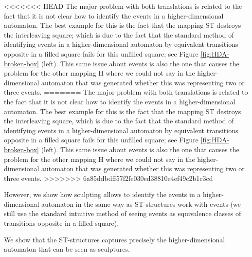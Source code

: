 <<<<<<< HEAD
    The major problem with both translations is related to the fact that it is not clear how to identify the events in a higher-dimensional automaton. The best example for this is the fact that the mapping ST destroys the interleaving square; which is due to the fact that the standard method of identifying events in a higher-dimensional automaton by equivalent transitions opposite in a filled square fails for this unfilled square; see Figure \ref{fig:HDA-broken-box} (left). This same issue about events is also the one that causes the problem for the other mapping H where we could not say in the higher-dimensional automaton that was generated whether this was representing two or three events.
=======
    The major problem with both translations is related to the fact that it is not clear how to identify the events in a higher-dimensional automaton. The best example for this is the fact that the mapping ST destroys the interleaving square, which is due to the fact that the standard method of identifying events in a higher-dimensional automaton by equivalent transitions opposite in a filled square fails for this unfilled square; see Figure \ref{fig:HDA-broken-box} (left). This same issue about events is also the one that causes the problem for the other mapping H where we could not say in the higher-dimensional automaton that was generated whether this was representing two or three events.
>>>>>>> 6a85ddbdff57f2fe030ed38810e4ef49c2b1c3cd
    
    However, we show how sculpting allows to identify the events in a higher-dimensional automaton in the same way as ST-structures work with events (we still use the standard intuitive method of seeing events as equivalence classes of transitions opposite in a filled square).
    
    We show that the ST-structures captures precisely the higher-dimensional automaton that can be seen as sculptures. 
    
    
    
    
